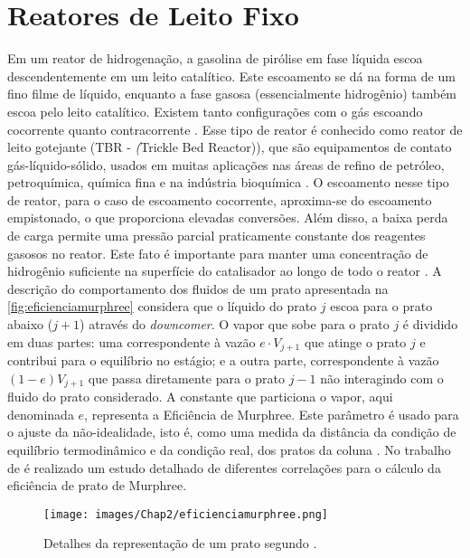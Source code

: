 \section{Reatores de Leito Fixo} \label{sec:reatoresfixo}
Em um reator de hidrogenação, a gasolina de pirólise em fase líquida escoa
descendentemente em um leito catalítico. Este escoamento se dá na forma de um
fino filme de líquido, enquanto a fase gasosa (essencialmente hidrogênio)
também escoa pelo leito catalítico. Existem tanto configurações com o gás
escoando cocorrente quanto contracorrente \cite{Authayanun2008}. Esse tipo de
reator é conhecido como reator de leito gotejante (TBR - \emph(Trickle Bed
Reactor)), que são equipamentos de contato gás-líquido-sólido, usados em muitas
aplicações nas áreas de refino de petróleo, petroquímica, química fina e na
indústria bioquímica \cite{Ranade2011}. 
O escoamento nesse tipo de reator, para o caso de escoamento cocorrente,
aproxima-se do escoamento empistonado, o que proporciona elevadas conversões.
Além disso, a baixa perda de carga permite uma pressão parcial praticamente
constante dos reagentes gasosos no reator. Este fato é importante para manter
uma concentração de hidrogênio suficiente na superfície do catalisador ao longo
de todo o reator \cite{Authayanun2008}.
A descrição do comportamento dos fluidos de um prato apresentada na \autoref{fig:eficienciamurphree}
considera que o líquido do prato
$j$ escoa para o prato abaixo ($j+1$) através do \textit{downcomer}. O vapor que sobe para o prato $j$ é
dividido em duas partes: uma correspondente à vazão $e \cdot V_{j+1}$ que atinge o prato
$j$ e contribui para o equilíbrio no estágio; e a outra parte, correspondente à vazão $(1-e)V_{j+1}$ que passa
diretamente para o prato $j-1$ não interagindo com o fluido do
prato considerado. A constante que particiona o vapor, aqui denominada $e$, representa a Eficiência de Murphree. Este
parâmetro é usado para o ajuste da não-idealidade, isto é, como uma medida da distância da condição de equilíbrio
termodinâmico e da condição real, dos pratos da coluna \cite{Elgue:2004}.
No trabalho de
 é realizado um estudo detalhado de diferentes correlações para o cálculo da eficiência
de prato de Murphree.

 \begin{figure}[htb]
 \centering \texttt{[image: images/Chap2/eficienciamurphree.png]}
 \caption{Detalhes da representação de um prato segundo .}
 \label{fig:eficienciamurphree}
 \end{figure}

